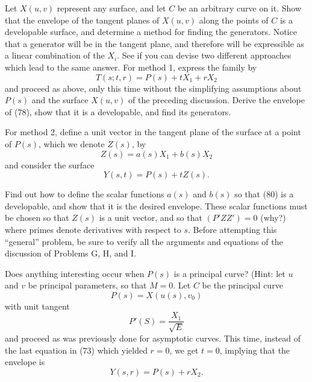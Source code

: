 \documentclass{book}
\begin{document}
Let $X(u,v)$ represent any surface, and let $C$ be an arbitrary curve on it. Show that the envelope of the tangent planes of $X(u,v)$ along the points of $C$ is a developable surface, and determine a method for finding the generators. Notice that a generator will be in the tangent plane, and therefore will be expressible as a linear combination of the $X_{i}$. See if you can devise two different approaches which lead to the same answer. For method 1, express the family by
\begin{equation}
T(s;t,r) = P(s) + tX_{1} + rX_{2}
\end{equation}
and proceed as above, only this time without the simplifying assumptions about $P(s)$ and the surface $X(u,v)$ of the preceding discussion. Derive the envelope of (78), show that it is a developable, and find its generators.

For method 2, define a unit vector in the tangent plane of the surface at a point of $P(s)$, which we denote $Z(s)$, by
\begin{equation}
Z(s) = a(s)X_{1} + b(s)X_{2}
\end{equation}
and consider the surface
\begin{equation}
Y(s,t) = P(s) + tZ(s).
\end{equation}

Find out how to define the scalar functions $a(s)$ and $b(s)$ so that (80) is a developable, and show that it is the desired envelope. These scalar functions must be chosen so that $Z(s)$ is a unit vector, and so that $(P'ZZ') = 0$ (why?) where primes denote derivatives with respect to $s$. Before attempting this ``general'' problem, be sure to verify all the arguments and equations of the discussion of Problems G, H, and I.

Does anything interesting occur when $P(s)$ is a principal curve? (Hint: let $u$ and $v$ be principal parameters, so that $M = 0$. Let $C$ be the principal curve
\begin{equation}
P(s) = X(u(s), v_{0})
\end{equation}
with unit tangent
\begin{equation*}
P'(S) = \frac{X_{1}}{\sqrt{E}}
\end{equation*}
and proceed as was previously done for asymptotic curves. This time, instead of the last equation in (73) which yielded $r = 0$, we get $t = 0$, implying that the envelope is
\begin{equation}
Y(s,r) = P(s) + rX_{2}.
\end{equation}
\end{document}

